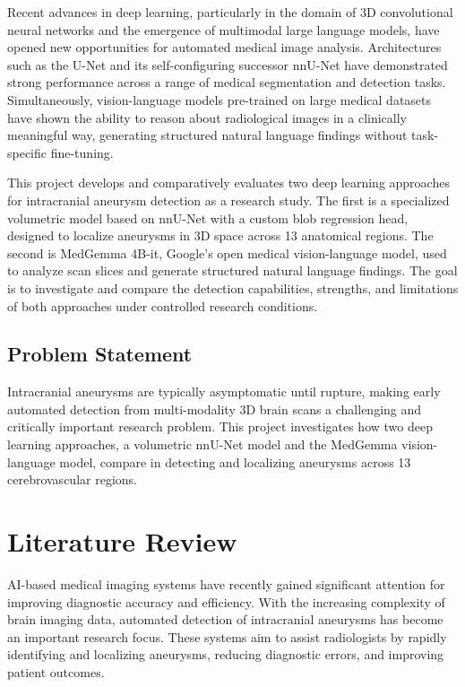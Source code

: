 \documentclass[twoside,a4paper,openright]{report} %
\begin{document}
Recent advances in deep learning, particularly in the domain of 3D convolutional neural networks and the emergence of multimodal large language models, have opened new opportunities for automated medical image analysis. Architectures such as the U-Net and its self-configuring successor nnU-Net have demonstrated strong performance across a range of medical segmentation and detection tasks. Simultaneously, vision-language models pre-trained on large medical datasets have shown the ability to reason about radiological images in a clinically meaningful way, generating structured natural language findings without task-specific fine-tuning.

This project develops and comparatively evaluates two deep learning approaches for intracranial aneurysm detection as a research study. The first is a specialized volumetric model based on nnU-Net with a custom blob regression head, designed to localize aneurysms in 3D space across 13 anatomical regions. The second is MedGemma 4B-it, Google's open medical vision-language model, used to analyze scan slices and generate structured natural language findings. The goal is to investigate and compare the detection capabilities, strengths, and limitations of both approaches under controlled research conditions.


 

\begin{flushleft}
\chapter{Problem Statement}
\end{flushleft}

\hspace{1.5cm}
Intracranial aneurysms are typically asymptomatic until rupture, making early automated detection from multi-modality 3D brain scans a challenging and critically important research problem. This project investigates how two deep learning approaches, a volumetric nnU-Net model and the MedGemma vision-language model, compare in detecting and localizing aneurysms across 13 cerebrovascular regions.
\paragraph{}


\chapter{Literature Review}
AI-based medical imaging systems have recently gained significant attention for improving diagnostic accuracy and efficiency. With the increasing complexity of brain imaging data, automated detection of intracranial aneurysms has become an important research focus. These systems aim to assist radiologists by rapidly identifying and localizing aneurysms, reducing diagnostic errors, and improving patient outcomes.
\end{document}
